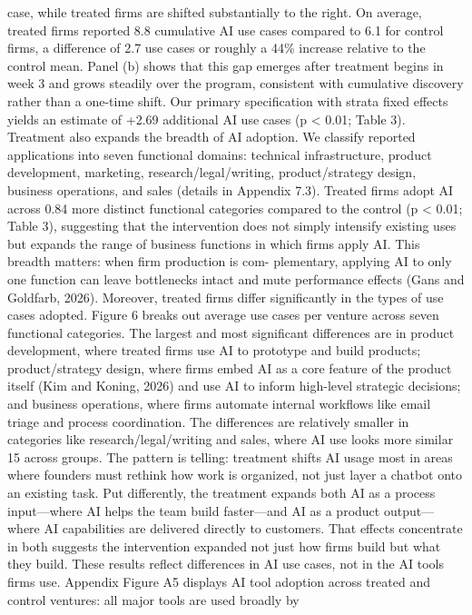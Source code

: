 case, while treated firms are shifted substantially to the right. On average, treated firms reported
8.8 cumulative AI use cases compared to 6.1 for control firms, a difference of 2.7 use cases or roughly
a 44\% increase relative to the control mean. Panel (b) shows that this gap emerges after treatment
begins in week 3 and grows steadily over the program, consistent with cumulative discovery rather
than a one-time shift. Our primary specification with strata fixed effects yields an estimate of +2.69
additional AI use cases (p < 0.01; Table 3).
Treatment also expands the breadth of AI adoption. We classify reported applications into seven
functional domains: technical infrastructure, product development, marketing, research/legal/writing,
product/strategy design, business operations, and sales (details in Appendix 7.3). Treated firms
adopt AI across 0.84 more distinct functional categories compared to the control (p < 0.01; Table 3),
suggesting that the intervention does not simply intensify existing uses but expands the range of
business functions in which firms apply AI. This breadth matters: when firm production is com-
plementary, applying AI to only one function can leave bottlenecks intact and mute performance
effects (Gans and Goldfarb, 2026).
Moreover, treated firms differ significantly in the types of use cases adopted. Figure 6 breaks out
average use cases per venture across seven functional categories. The largest and most significant
differences are in product development, where treated firms use AI to prototype and build products;
product/strategy design, where firms embed AI as a core feature of the product itself (Kim and
Koning, 2026) and use AI to inform high-level strategic decisions; and business operations, where
firms automate internal workflows like email triage and process coordination. The differences are
relatively smaller in categories like research/legal/writing and sales, where AI use looks more similar
15
across groups. The pattern is telling: treatment shifts AI usage most in areas where founders must
rethink how work is organized, not just layer a chatbot onto an existing task. Put differently, the
treatment expands both AI as a process input—where AI helps the team build faster—and AI as a
product output—where AI capabilities are delivered directly to customers. That effects concentrate
in both suggests the intervention expanded not just how firms build but what they build.
These results reflect differences in AI use cases, not in the AI tools firms use. Appendix Figure A5
displays AI tool adoption across treated and control ventures: all major tools are used broadly by
